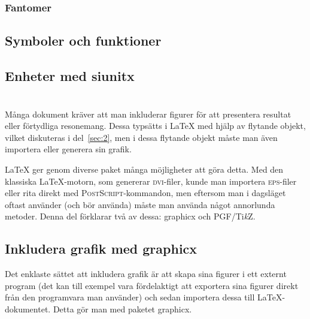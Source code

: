 \documentclass[swe,12pt]{skrapport}
\makeatletter
\newcommand\DVI{\textsc{dvi}}							%
\newcommand\EPS{\textsc{eps}}							%
\newcommand\pack[1]{\textsf{#1}}						%
\newcommand\pdfLaTeX{\hologo{pdfLaTeX}}					%
\newcommand\PGFTikZ{PGF/Ti\emph{k}Z}					%
\let\section@old=\section
\renewcommand\section{\@ifstar\my@section@star\my@section}
\newcommand\my@section[2][\@empty]{\newpage\ifx\@empty#1\section@old{#2}\else\section@old[#1]{#2}\fi}
\newcommand\my@section@star[2][\@empty]{\newpage\ifx\@empty#1\section@old*{#2}\else\section@old*[#1]{#2}\fi}
\makeatother
\begin{document}
	\subsubsection{Fantomer}
	
	\subsection{Symboler och funktioner}
	
	\subsection{Enheter med \pack{siunitx}}
	
	\section{Grafik med \LaTeX}\label{sec:4}
	Många dokument kräver att man inkluderar figurer för att presentera
	resultat eller förtydliga resonemang. Dessa typsätts i \LaTeX{} med hjälp
	av flytande objekt, vilket diskuteras i del~\ref{sec:2}, men i dessa
	flytande objekt måste man även importera eller generera sin grafik.
	
	\LaTeX{} ger genom diverse paket många möjligheter att göra detta. Med den
	klassiska \LaTeX{}-motorn, som genererar \DVI-filer, kunde man importera
	\EPS-filer eller rita direkt med \textsc{PostScript}-kommandon, men
	eftersom man i dagsläget oftast använder (och bör använda) \pdfLaTeX{}
	måste man använda något annorlunda metoder. Denna del förklarar två av
	dessa: \pack{graphicx} och \PGFTikZ.
	
	\subsection{Inkludera grafik med \pack{graphicx}}
	Det enklaste sättet att inkludera grafik är att skapa sina figurer i ett
	externt program (det kan till exempel vara fördelaktigt att exportera sina
	figurer direkt från den programvara man använder) och sedan importera
	dessa till \LaTeX{}-dokumentet. Detta gör man med paketet \pack{graphicx}.
	
\end{document}
